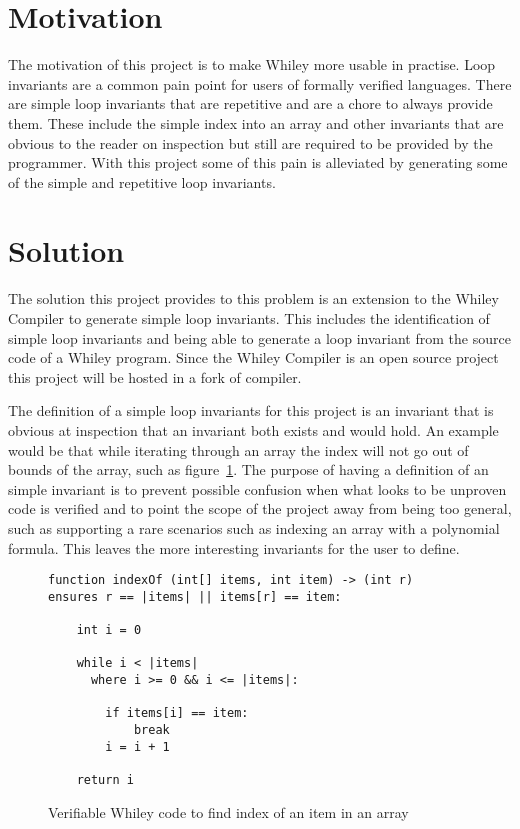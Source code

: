 \section{Motivation}

The motivation of this project is to make Whiley more usable in practise.
Loop invariants are a common pain point for users of formally verified
languages.
There are simple loop invariants that are repetitive and are a chore to
always provide them.
These include the simple index into an array and other invariants that
are obvious to the reader on inspection but still are required to be
provided by the programmer.
With this project some of this pain is alleviated by generating some of the simple
and repetitive loop invariants.

\section{Solution}

The solution this project provides to this problem is an extension to
the Whiley Compiler to generate simple loop invariants.
This includes the identification of simple loop invariants and being able
to generate a loop invariant from the source code of a Whiley program.
Since the Whiley Compiler is an open source project this project will be
hosted in a fork of compiler.

The definition of a simple loop invariants for this project is an invariant that is
obvious at inspection that an invariant both exists and would hold.
An example would be that while iterating through an array the index
will not go out of bounds of the array, such as figure~\ref{lst:whiley-ex-1}.
The purpose of having a definition of an simple invariant is to prevent
possible confusion when what looks to be unproven code is verified and to point
the scope of the project away from being too general, such as supporting
a rare scenarios such as indexing an array with a polynomial formula.
This leaves the more interesting invariants for the user to define.

\begin{figure}[ht]
\begin{lstlisting}
function indexOf (int[] items, int item) -> (int r)
ensures r == |items| || items[r] == item:

    int i = 0

    while i < |items|
      where i >= 0 && i <= |items|:

        if items[i] == item:
            break
        i = i + 1

    return i
\end{lstlisting}
\caption{Verifiable Whiley code to find index of an item in an array}
\label{lst:whiley-ex-1}
\end{figure}

